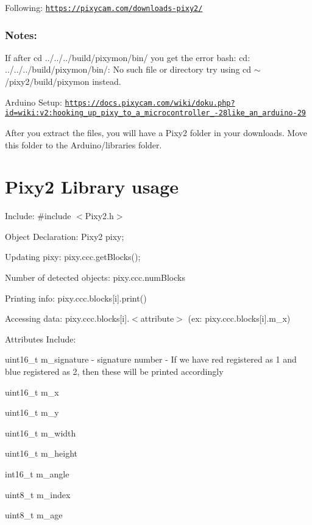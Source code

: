Following\+: \href{https://pixycam.com/downloads-pixy2/}{\tt https\+://pixycam.\+com/downloads-\/pixy2/}

\subsubsection*{Notes\+:}

If after {\ttfamily cd ../../../build/pixymon/bin/} you get the error {\ttfamily bash\+: cd\+: ../../../build/pixymon/bin/\+: No such file or directory} try using {\ttfamily cd $\sim$/pixy2/build/pixymon} instead.

Arduino Setup\+: \href{https://docs.pixycam.com/wiki/doku.php?id=wiki:v2:hooking_up_pixy_to_a_microcontroller_-28like_an_arduino-29}{\tt https\+://docs.\+pixycam.\+com/wiki/doku.\+php?id=wiki\+:v2\+:hooking\+\_\+up\+\_\+pixy\+\_\+to\+\_\+a\+\_\+microcontroller\+\_\+-\/28like\+\_\+an\+\_\+arduino-\/29}

After you extract the files, you will have a Pixy2 folder in your downloads. Move this folder to the Arduino/libraries folder.

\section*{Pixy2 Library usage}


\begin{DoxyItemize}
\item Include\+: {\ttfamily \#include $<$Pixy2.\+h$>$}
\item Object Declaration\+: {\ttfamily Pixy2 pixy;}
\item Updating pixy\+: {\ttfamily pixy.\+ccc.\+get\+Blocks();}
\item Number of detected objects\+: {\ttfamily pixy.\+ccc.\+num\+Blocks}
\item Printing info\+: {\ttfamily pixy.\+ccc.\+blocks\mbox{[}i\mbox{]}.print()}
\item Accessing data\+: {\ttfamily pixy.\+ccc.\+blocks\mbox{[}i\mbox{]}.$<$attribute$>$} (ex\+: {\ttfamily pixy.\+ccc.\+blocks\mbox{[}i\mbox{]}.m\+\_\+x})
\begin{DoxyItemize}
\item Attributes Include\+:
\begin{DoxyItemize}
\item {\ttfamily uint16\+\_\+t m\+\_\+signature} -\/ signature number -\/ If we have red registered as 1 and blue registered as 2, then these will be printed accordingly
\item {\ttfamily uint16\+\_\+t m\+\_\+x}
\item {\ttfamily uint16\+\_\+t m\+\_\+y}
\item {\ttfamily uint16\+\_\+t m\+\_\+width}
\item {\ttfamily uint16\+\_\+t m\+\_\+height}
\item {\ttfamily int16\+\_\+t m\+\_\+angle}
\item {\ttfamily uint8\+\_\+t m\+\_\+index}
\item {\ttfamily uint8\+\_\+t m\+\_\+age} 
\end{DoxyItemize}
\end{DoxyItemize}
\end{DoxyItemize}